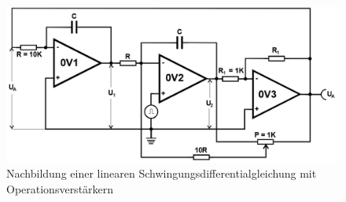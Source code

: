 \begin{figure}[h!]
 	\centering
 	\includegraphics[width=\textwidth]{img/sin.png}
 	\caption{Nachbildung einer linearen Schwingungsdifferentialgleichung mit Operationsverstärkern \cite{FP}}
 	\label{abb:sig2}
\end{figure}
